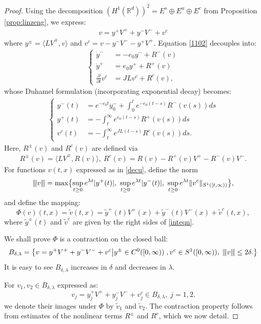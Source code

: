 \documentclass[12pt]{amsart}
\newcommand{\R}{\mathbb R}
\newcommand{\vertiii}[1]{{\left\vert\kern-0.25ex\left\vert\kern-0.25ex\left\vert #1 
    \right\vert\kern-0.25ex\right\vert\kern-0.25ex\right\vert}}
\begin{document}
\begin{proof} 
Using the decomposition $(H^1(\R^d))^2=E^s\oplus E^u\oplus E^c$ from Proposition \ref{prop:linzeng}, we express: 
\begin{align}\label{decu}
v=y^+V^++y^-V^-+v^c
\end{align}
where $y^{\pm}=\langle LV^{\mp}, v\rangle$ and $v^c=v-y^-V^--y^+V^+$. Equation \eqref{1102}  decouples into:
\begin{align*}
\begin{cases}
\dot y^-&=-e_0 y^-+R^-(v)\\
\dot y^+&=e_0 y^++R^+(v)\\
\frac{\partial}{\partial t}v^c&=JL v^c+R^c(v), 
\end{cases}
\end{align*}
whose Duhamel formulation (incorporating exponential decay) becomes:
\begin{align}\label{inteqn}
\begin{cases}
y^-(t)&=e^{-e_0 t} y_0^-+\int_0^t e^{-e_0(t-s) }R^-(v(s))ds\\
y^+(t)&=-\int_t^\infty e^{e_0(t-s)}R^+(v(s))ds\\
v^c(t)&=-\int_t^\infty e^{JL(t-s)}R^c(v(s))ds. 
\end{cases}
\end{align}
Here, $R^{\pm}(v)$ and $R^c(v)$ are defined via
\begin{align*}
R^{\pm}(v)=\langle LV^{\mp}, R(v)\rangle, \ R^c(v)=R(v)-R^+(v)V^+-R^-(v)V^-. 
\end{align*}
For functions $v(t, x)$ expressed as in \eqref{decu}, define the norm 
\[
\vertiii{ v}=\max\bigl\{\sup_{t\ge 0} e^{\lambda t}|y^+(t)|, \ \sup_{t\ge 0} e^{\lambda t}|y^-(t)|,\ \sup_{t\ge 0} e^{\lambda t}\|v^c\|_{S^1([t,\infty))}\bigr\},
\]
and define the mapping: 
\[
\Phi (v) (t,x) = \tilde v (t, x)  = \tilde y^+  (t) V^+(x) + \tilde y^-(t) V^-(x) + \tilde v^c(t, x),
\]
where $\tilde y^\pm (t)$ and $\tilde v^c$ are given by the right sides of \eqref{inteqn}. 

We shall prove $\Phi$ is a contraction on the closed ball:
\begin{align*}
B_{\delta,\lambda}=\bigl \{v = y^+ V^+ + y^- V^-+ v^c \bigl | y^{\pm} \in C^0([0, \infty))\;, v^c\in  S^1 ([0, \infty)),\; \vertiii{v}\le 2\delta.\bigr\}
\end{align*}
It is easy to see $B_{\delta, \lambda}$ increases in $\delta$ and decreases in $\lambda$. 

For $v_1, v_2 \in B_{\delta, \lambda}$ expressed as:  
\[v_j=y_j^+V^++y_j^-V^-+v_j^c\in B_{\delta, \lambda}, \; j=1,2. \]
we denote their images under $\Phi$ by $\tilde v_1$ and $\tilde v_2$. The contraction property follows from estimates of the nonlinear terms $R^{\pm}$ and $R^c$, which we now detail. 


\end{proof}
\end{document}
